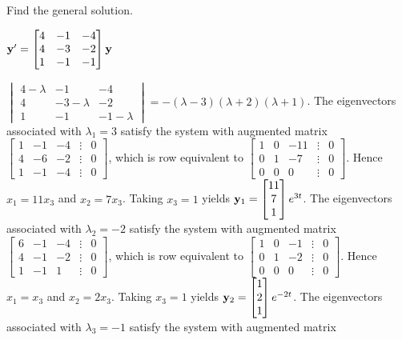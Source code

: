 \documentclass{ximera}
\begin{document}
\begin{problem}\label{exer:10.4.12}
Find the general solution.

$ {\bf y}'=
\begin{bmatrix}
4&-1&-4\\4&-3&-2\\1&-1&-1\end{bmatrix}{\bf y}$

\begin{solution}
    $ \begin{vmatrix}4-\lambda&-1&-4\\4&-3-\lambda&-2\\
1&-1&-1-\lambda\end{vmatrix}=-(\lambda-3)(\lambda+2)(\lambda+1)$.
The eigenvectors associated
 with $\lambda_1=3$ satisfy the system with  augmented matrix
$  \begin{bmatrix}1&-1&-4&\vdots&0\\4&-6
&-2&\vdots&0\\1&-1&-4&\vdots&0
 \end{bmatrix}$,
which is row equivalent to
$  \begin{bmatrix}1&0&-11&\vdots&0\\0&1&-7&
\vdots&0\\0&0&0&\vdots&0 \end{bmatrix}$.
Hence  $x_1=11x_3$ and $x_2=7x_3$.  Taking $x_3=1$ yields
${\bf y}_1=  \begin{bmatrix}11\\7\\1
 \end{bmatrix}e^{3t}$.
The eigenvectors associated
 with $\lambda_2=-2$ satisfy the system with  augmented matrix
$  \begin{bmatrix}6&-1&-4&\vdots&0\\4&-1
&-2&\vdots&0\\1&-1&1&\vdots&0
 \end{bmatrix}$,
which is row equivalent to
$  \begin{bmatrix}1&0&-1&\vdots&0\\0&1&-2&
\vdots&0\\0&0&0&\vdots&0 \end{bmatrix}$.
Hence $x_1=x_3$ and $x_2=2x_3$.  Taking $x_3=1$ yields
${\bf y}_2=  \begin{bmatrix}1\\2\\1
 \end{bmatrix}e^{-2t}$.
The eigenvectors associated
 with $\lambda_3=-1$ satisfy the system with  augmented matrix

\end{solution}
\end{problem}
\end{document}

